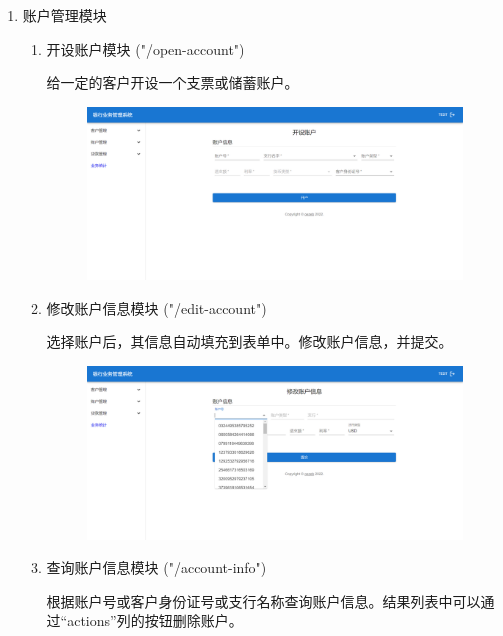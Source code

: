 \documentclass{ctexart}
\begin{document}
\begin{enumerate}
    \item 账户管理模块
    
    \begin{enumerate}
        \item 开设账户模块 ("/open-account")
        
        给一定的客户开设一个支票或储蓄账户。
        
        \begin{figure}[H]
            \centering
            \includegraphics[width=\textwidth]{assets/images/open-account.png}
        \end{figure}

        \item 修改账户信息模块 ("/edit-account")
        
        选择账户后，其信息自动填充到表单中。修改账户信息，并提交。
        
        \begin{figure}[H]
            \centering
            \includegraphics[width=\textwidth]{assets/images/edit-account.png}
        \end{figure}

        \item 查询账户信息模块 ("/account-info")
        
        根据账户号或客户身份证号或支行名称查询账户信息。结果列表中可以通过“actions”列的按钮删除账户。
        

\end{enumerate}
\end{enumerate}
\end{document}

